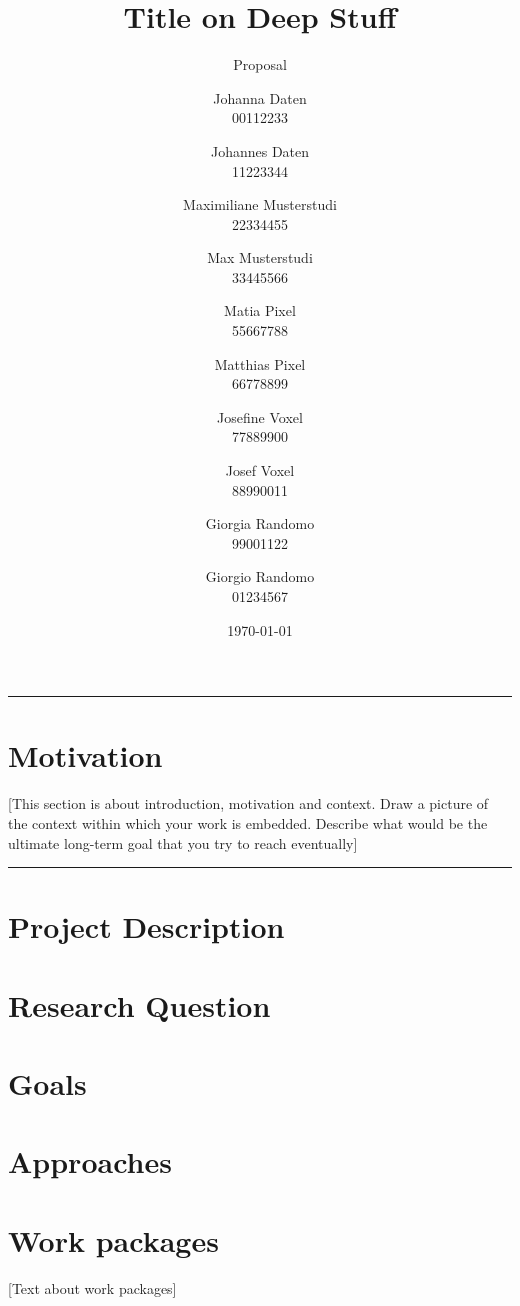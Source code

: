 \documentclass[lang=english,inputenc=utf8,fontsize=10pt]{ldvarticle}
\title{Title on Deep Stuff}
\subtitle{Proposal}
\author{Johanna Daten\\
00112233
\and
Johannes Daten\\
11223344
\and
Maximiliane Musterstudi\\
22334455
\and
Max Musterstudi\\
33445566
\and
Matia Pixel\\
55667788
\and
Matthias Pixel\\
66778899
\and
Josefine Voxel\\
77889900
\and
Josef Voxel\\
88990011
\and
Giorgia Randomo\\
99001122
\and
Giorgio Randomo\\
01234567
}
\date{\today}
\begin{document}
\maketitle
\thispagestyle{empty}

\hrule

\section*{Motivation}

[This section is about introduction, motivation and context. Draw a picture of the context within which your work is embedded. Describe what would be the ultimate long-term goal that you try to reach eventually] \lipsum[2-3]

\vspace*{1cm}
\hrule

\newpage

\section{Project Description}

\lipsum[3]

\section*{Research Question}

\lipsum[4]

\section*{Goals}

\lipsum[5]
	
\section*{Approaches}

\lipsum[6]

\newpage

\section{Work packages}

[Text about work packages] \lipsum[2-3]
\end{document}
